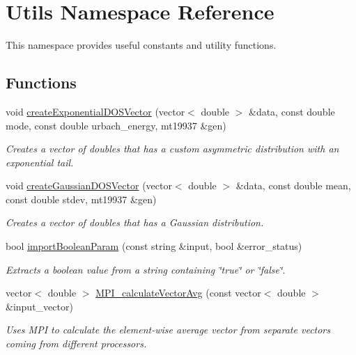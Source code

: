 \hypertarget{namespace_utils}{}\section{Utils Namespace Reference}
\label{namespace_utils}


This namespace provides useful constants and utility functions.  


\subsection*{Functions}
\begin{DoxyCompactItemize}
\item 
void \hyperlink{namespace_utils_ad895b1edcec8254af3279938d0ed4ac0}{create\+Exponential\+D\+O\+S\+Vector} (vector$<$ double $>$ \&data, const double mode, const double urbach\+\_\+energy, mt19937 \&gen)
\begin{DoxyCompactList}\small\item\em Creates a vector of doubles that has a custom asymmetric distribution with an exponential tail. \end{DoxyCompactList}\item 
void \hyperlink{namespace_utils_a564bff107c9e05003ff99593968a86fc}{create\+Gaussian\+D\+O\+S\+Vector} (vector$<$ double $>$ \&data, const double mean, const double stdev, mt19937 \&gen)
\begin{DoxyCompactList}\small\item\em Creates a vector of doubles that has a Gaussian distribution. \end{DoxyCompactList}\item 
bool \hyperlink{namespace_utils_afac80acf3a99a5cd96b84bffb4becbb4}{import\+Boolean\+Param} (const string \&input, bool \&error\+\_\+status)
\begin{DoxyCompactList}\small\item\em Extracts a boolean value from a string containing \char`\"{}true\char`\"{} or \char`\"{}false\char`\"{}. \end{DoxyCompactList}\item 
vector$<$ double $>$ \hyperlink{namespace_utils_ac9a27519719bf1493bb2b4f56b0019c9}{M\+P\+I\+\_\+calculate\+Vector\+Avg} (const vector$<$ double $>$ \&input\+\_\+vector)
\begin{DoxyCompactList}\small\item\em Uses M\+PI to calculate the element-\/wise average vector from separate vectors coming from different processors. \end{DoxyCompactList}\item 

\end{DoxyCompactItemize}
